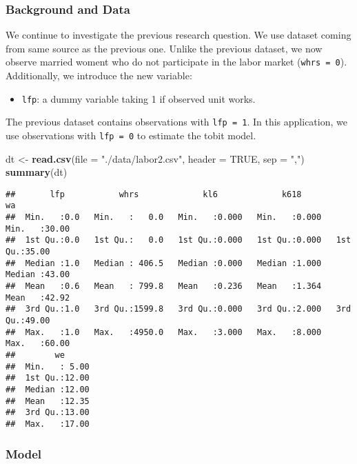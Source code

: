 \documentclass[
  12pt,
]{article}
\newenvironment{Shaded}{\begin{snugshade}}{\end{snugshade}}
\newcommand{\DataTypeTok}[1]{\textcolor[rgb]{0.13,0.29,0.53}{#1}}
\newcommand{\KeywordTok}[1]{\textcolor[rgb]{0.13,0.29,0.53}{\textbf{#1}}}
\newcommand{\NormalTok}[1]{#1}
\newcommand{\OtherTok}[1]{\textcolor[rgb]{0.56,0.35,0.01}{#1}}
\newcommand{\StringTok}[1]{\textcolor[rgb]{0.31,0.60,0.02}{#1}}
\providecommand{\tightlist}{%
  \setlength{\itemsep}{0pt}\setlength{\parskip}{0pt}}
\begin{document}
\hypertarget{background-and-data-4}{%
\subsubsection{Background and Data}\label{background-and-data-4}}

We continue to investigate the previous research question.
We use dataset coming from same source as the previous one.
Unlike the previous dataset,
we now observe married woment who do not participate in the labor market (\texttt{whrs\ =\ 0}).
Additionally, we introduce the new variable:

\begin{itemize}
\tightlist
\item
  \texttt{lfp}: a dummy variable taking 1 if observed unit works.
\end{itemize}

The previous dataset contains observations with \texttt{lfp\ =\ 1}.
In this application, we use observations with \texttt{lfp\ =\ 0} to estimate the tobit model.

\begin{Shaded}
\begin{Highlighting}[]
\NormalTok{dt \textless{}{-}}\StringTok{ }\KeywordTok{read.csv}\NormalTok{(}\DataTypeTok{file =} \StringTok{"./data/labor2.csv"}\NormalTok{, }\DataTypeTok{header =} \OtherTok{TRUE}\NormalTok{,  }\DataTypeTok{sep =} \StringTok{","}\NormalTok{)}
\KeywordTok{summary}\NormalTok{(dt)}
\end{Highlighting}
\end{Shaded}

\begin{verbatim}
##       lfp           whrs             kl6             k618             wa       
##  Min.   :0.0   Min.   :   0.0   Min.   :0.000   Min.   :0.000   Min.   :30.00  
##  1st Qu.:0.0   1st Qu.:   0.0   1st Qu.:0.000   1st Qu.:0.000   1st Qu.:35.00  
##  Median :1.0   Median : 406.5   Median :0.000   Median :1.000   Median :43.00  
##  Mean   :0.6   Mean   : 799.8   Mean   :0.236   Mean   :1.364   Mean   :42.92  
##  3rd Qu.:1.0   3rd Qu.:1599.8   3rd Qu.:0.000   3rd Qu.:2.000   3rd Qu.:49.00  
##  Max.   :1.0   Max.   :4950.0   Max.   :3.000   Max.   :8.000   Max.   :60.00  
##        we       
##  Min.   : 5.00  
##  1st Qu.:12.00  
##  Median :12.00  
##  Mean   :12.35  
##  3rd Qu.:13.00  
##  Max.   :17.00
\end{verbatim}

\hypertarget{model-3}{%
\subsubsection{Model}\label{model-3}}
\end{document}
